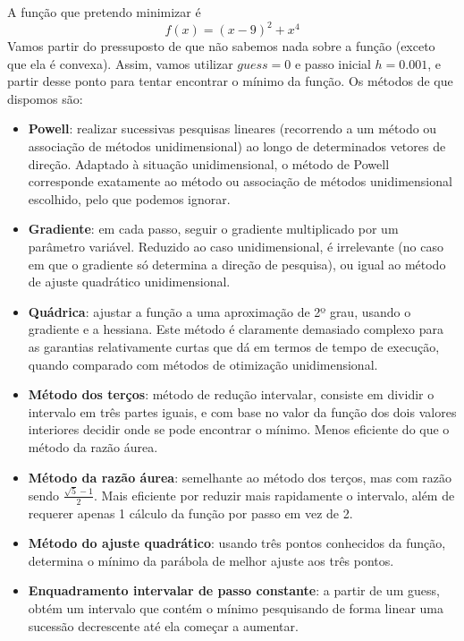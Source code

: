 \setcounter{chapter}{16}
{
\renewcommand{\thesubsection}{\thesection\alph{subsection}}

A função que pretendo minimizar é
\begin{equation*}
    f(x)=(x-9)^2+x^4
\end{equation*}
Vamos partir do pressuposto de que não sabemos nada sobre a função (exceto que ela é convexa). Assim, vamos utilizar $guess=0$ e passo inicial $h=0.001$, e partir desse ponto para tentar encontrar o mínimo da função.
Os métodos de que dispomos são:
\begin{itemize}
    \item \textbf{Powell}: realizar sucessivas pesquisas lineares (recorrendo a um método ou associação de métodos unidimensional) ao longo de determinados vetores de direção. Adaptado à situação unidimensional, o método de Powell corresponde exatamente ao método ou associação de métodos unidimensional escolhido, pelo que podemos ignorar.
    \item \textbf{Gradiente}: em cada passo, seguir o gradiente multiplicado por um parâmetro variável. Reduzido ao caso unidimensional, é irrelevante (no caso em que o gradiente só determina a direção de pesquisa), ou igual ao método de ajuste quadrático unidimensional.
    \item \textbf{Quádrica}: ajustar a função a uma aproximação de 2º grau, usando o gradiente e a hessiana. Este método é claramente demasiado complexo para as garantias relativamente curtas que dá em termos de tempo de execução, quando comparado com métodos de otimização unidimensional.
    \item \textbf{Método dos terços}: método de redução intervalar, consiste em dividir o intervalo em três partes iguais, e com base no valor da função dos dois valores interiores decidir onde se pode encontrar o mínimo. Menos eficiente do que o método da razão áurea.
    \item \textbf{Método da razão áurea}: semelhante ao método dos terços, mas com razão sendo $\frac{\sqrt{5}-1}{2}$. Mais eficiente por reduzir mais rapidamente o intervalo, além de requerer apenas 1 cálculo da função por passo em vez de 2.
    \item \textbf{Método do ajuste quadrático}: usando três pontos conhecidos da função, determina o mínimo da parábola de melhor ajuste aos três pontos.
    \item \textbf{Enquadramento intervalar de passo constante}: a partir de um guess, obtém um intervalo que contém o mínimo pesquisando de forma linear uma sucessão decrescente até ela começar a aumentar.

\end{itemize}}
